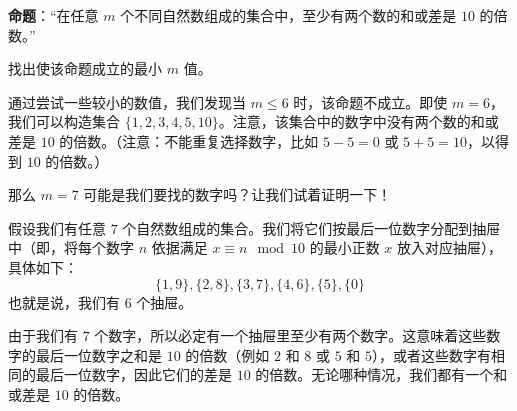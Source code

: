 \begin{example}
    \textbf{命题}：``在任意 $m$ 个不同自然数组成的集合中，至少有两个数的和或差是 $10$ 的倍数。''

    找出使该命题成立的最小 $m$ 值。

    通过尝试一些较小的数值，我们发现当 $m \le 6$ 时，该命题不成立。即使 $m = 6$，我们可以构造集合 $\{1, 2, 3, 4, 5, 10\}$。注意，该集合中的数字中没有两个数的和或差是 $10$ 的倍数。（注意：不能重复选择数字，比如 $5 - 5 = 0$ 或 $5 + 5 = 10$，以得到 $10$ 的倍数。）

    那么 $m = 7$ 可能是我们要找的数字吗？让我们试着证明一下！

    假设我们有任意 $7$ 个自然数组成的集合。我们将它们按最后一位数字分配到抽屉中（即，将每个数字 $n$ 依据满足 $x \equiv n \mod 10$ 的最小正数 $x$ 放入对应抽屉），具体如下：
    \[\{1, 9\}, \{2, 8\}, \{3, 7\}, \{4, 6\}, \{5\}, \{0\}\]
    也就是说，我们有 $6$ 个抽屉。

    由于我们有 $7$ 个数字，所以必定有一个抽屉里至少有两个数字。这意味着这些数字的最后一位数字之和是 $10$ 的倍数（例如 $2$ 和 $8$ 或 $5$ 和 $5$），或者这些数字有相同的最后一位数字，因此它们的差是 $10$ 的倍数。无论哪种情况，我们都有一个和或差是 $10$ 的倍数。
\end{example}